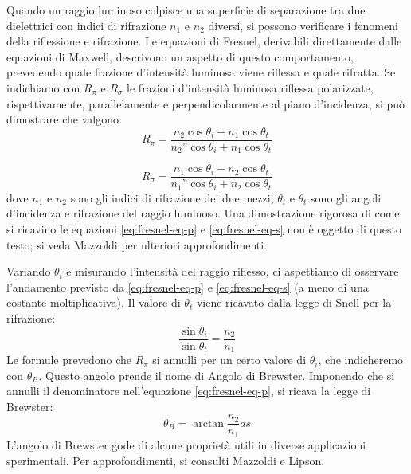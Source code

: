 Quando un raggio luminoso colpisce una superficie di separazione tra due
dielettrici con indici di rifrazione $n_1$ e $n_2$ diversi, si possono verificare
i fenomeni della riflessione e rifrazione.
Le equazioni di Fresnel, derivabili direttamente dalle equazioni di Maxwell, %
descrivono un aspetto di questo comportamento, prevedendo quale frazione d'intensità
luminosa viene riflessa e quale rifratta. Se indichiamo con $R_\pi$ e $R_\sigma$ le
frazioni d'intensità luminosa riflessa polarizzate, rispettivamente, parallelamente
e perpendicolarmente al piano d'incidenza, si può dimostrare che valgono:
%
\begin{equation}
  R_\pi = \frac {
    n_2 \cos{\theta_i} - n_1 \cos{\theta_t}
  } {
    n_2” \cos{\theta_i} + n_1 \cos{\theta_t}
  }\label{eq:fresnel-eq-p}
\end{equation}

\begin{equation}
  R_\sigma = \frac {
    n_1 \cos{\theta_i} - n_2 \cos{\theta_t}
  } {
    n_1” \cos{\theta_i} + n_2 \cos{\theta_t}
  }\label{eq:fresnel-eq-s}
\end{equation}
%
\noindent dove $n_1$ e $n_2$ sono gli indici di rifrazione dei due mezzi, $\theta_i$ e
$\theta_t$ sono gli angoli d'incidenza e rifrazione del raggio luminoso.
Una dimostrazione rigorosa di come si ricavino le equazioni \eqref{eq:fresnel-eq-p} e \eqref{eq:fresnel-eq-s} non è oggetto
di questo testo;
si veda Mazzoldi\cite{mazzoldi98} per ulteriori approfondimenti.

Variando $\theta_i$ e misurando l’intensità del raggio riflesso,
ci aspettiamo di osservare l'andamento previsto da \eqref{eq:fresnel-eq-p} e \eqref{eq:fresnel-eq-s} (a meno di una
costante moltiplicativa).
Il valore di $\theta_t$ viene ricavato dalla legge di Snell per la rifrazione:
%
\begin{equation}
  \frac {\sin{\theta_i}} {\sin{\theta_t}} = \frac {n_2} {n_1}
  \label{eq:legge-snell}
\end{equation}
%
\noindent Le formule prevedono che $R_\pi$ si annulli per un certo valore di $\theta_i$,
che indicheremo con $\theta_B$.
Questo angolo prende il nome di Angolo di Brewster. Imponendo che si annulli il
denominatore nell'equazione \eqref{eq:fresnel-eq-p}, si ricava la legge di Brewster:
%
\begin{equation}
  \theta_B = \arctan{
    \frac {n_2} {n_1}as
  }\label{eq:legge-brewster}
\end{equation}
%
\noindent  L’angolo di Brewster gode di alcune proprietà utili in diverse applicazioni
sperimentali.
Per approfondimenti, si consulti Mazzoldi\cite{mazzoldi98} e Lipson\cite{lipson20}.
\endinput
